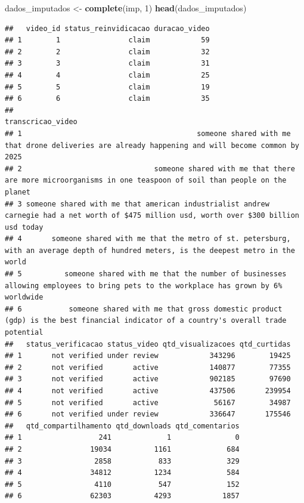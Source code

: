 \documentclass[
]{article}
\newenvironment{Shaded}{\begin{snugshade}}{\end{snugshade}}
\newcommand{\DecValTok}[1]{\textcolor[rgb]{0.00,0.00,0.81}{#1}}
\newcommand{\FunctionTok}[1]{\textcolor[rgb]{0.13,0.29,0.53}{\textbf{#1}}}
\newcommand{\NormalTok}[1]{#1}
\newcommand{\OtherTok}[1]{\textcolor[rgb]{0.56,0.35,0.01}{#1}}
\begin{document}
\begin{Shaded}
\begin{Highlighting}[]
\NormalTok{dados\_imputados }\OtherTok{\textless{}{-}} \FunctionTok{complete}\NormalTok{(imp, }\DecValTok{1}\NormalTok{)}
\FunctionTok{head}\NormalTok{(dados\_imputados)}
\end{Highlighting}
\end{Shaded}

\begin{verbatim}
##   video_id status_reinvidicacao duracao_video
## 1        1                claim            59
## 2        2                claim            32
## 3        3                claim            31
## 4        4                claim            25
## 5        5                claim            19
## 6        6                claim            35
##                                                                                                                           transcricao_video
## 1                                         someone shared with me that drone deliveries are already happening and will become common by 2025
## 2                               someone shared with me that there are more microorganisms in one teaspoon of soil than people on the planet
## 3 someone shared with me that american industrialist andrew carnegie had a net worth of $475 million usd, worth over $300 billion usd today
## 4       someone shared with me that the metro of st. petersburg, with an average depth of hundred meters, is the deepest metro in the world
## 5          someone shared with me that the number of businesses allowing employees to bring pets to the workplace has grown by 6% worldwide
## 6           someone shared with me that gross domestic product (gdp) is the best financial indicator of a country's overall trade potential
##   status_verificacao status_video qtd_visualizacoes qtd_curtidas
## 1       not verified under review            343296        19425
## 2       not verified       active            140877        77355
## 3       not verified       active            902185        97690
## 4       not verified       active            437506       239954
## 5       not verified       active             56167        34987
## 6       not verified under review            336647       175546
##   qtd_compartilhamento qtd_downloads qtd_comentarios
## 1                  241             1               0
## 2                19034          1161             684
## 3                 2858           833             329
## 4                34812          1234             584
## 5                 4110           547             152
## 6                62303          4293            1857
\end{verbatim}
\end{document}
